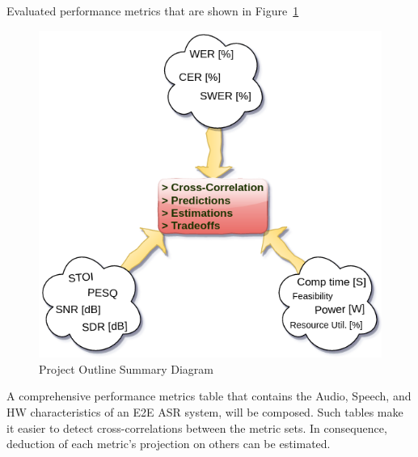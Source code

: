 \bigskip

Evaluated performance metrics that
are shown in Figure~\ref{fig:metrics_cross_blocks}

\begin{figure}[H]
    \centering
    \includegraphics[width=0.75\linewidth]{Introduction/images/metrics_cross_blocks}
    \caption{Project Outline Summary Diagram}\label{fig:metrics_cross_blocks}
\end{figure}

A comprehensive performance metrics table that contains the Audio,
Speech, and HW characteristics
of an E2E ASR system, will be composed.
Such tables make it easier to detect cross-correlations between the metric sets.
In consequence, 
deduction of each metric's
projection on others can be estimated.






